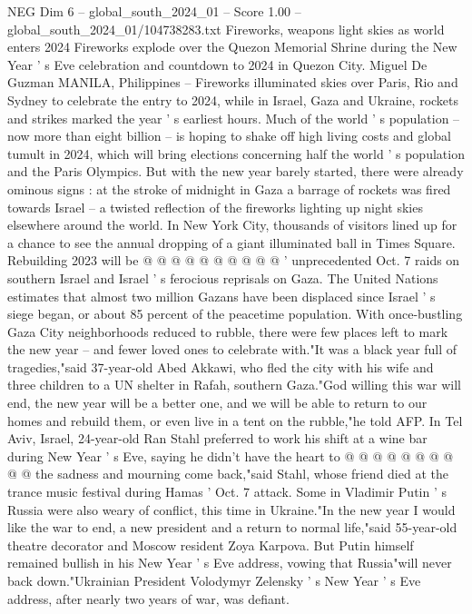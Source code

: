 \begin{textsample}{NEG Dim 6 – global\_south\_2024\_01 – Score 1.00 – global\_south\_2024\_01/104738283.txt}  \label{ex:f6_neg_372}
Fireworks, weapons light skies as world enters 2024 Fireworks explode over the Quezon Memorial Shrine during the New Year ' s Eve celebration and countdown to 2024 in Quezon City.
Miguel De Guzman MANILA, Philippines -- Fireworks illuminated skies over Paris, Rio and Sydney to celebrate the entry to 2024, while in Israel, Gaza and Ukraine, rockets and strikes marked the year ' s earliest hours.
Much of the world ' s population -- now more than eight billion -- is hoping to shake off high living costs and global tumult in 2024, which will bring elections concerning half the world ' s population and the Paris Olympics.
But with the new year barely started, there were already ominous signs : at the stroke of midnight in Gaza a barrage of rockets was fired towards Israel -- a twisted reflection of the fireworks lighting up night skies elsewhere around the world.
In New York City, thousands of visitors lined up for a chance to see the annual dropping of a giant illuminated ball in Times Square.
Rebuilding 2023 will be @ @ @ @ @ @ @ @ @ @ ' unprecedented Oct. 7 raids on southern Israel and Israel ' s ferocious reprisals on Gaza.
The United Nations estimates that almost two million Gazans have been displaced since Israel ' s siege began, or about 85 percent of the peacetime population.
With once-bustling Gaza City neighborhoods reduced to rubble, there were few places left to mark the new year -- and fewer loved ones to celebrate with."It was a black year full of tragedies,"said 37-year-old Abed Akkawi, who fled the city with his wife and three children to a UN shelter in Rafah, southern Gaza."God willing this war will end, the new year will be a better one, and we will be able to return to our homes and rebuild them, or even live in a tent on the rubble,"he told AFP.
In Tel Aviv, Israel, 24-year-old Ran Stahl preferred to work his shift at a wine bar during New Year ' s Eve, saying he didn't have the heart to @ @ @ @ @ @ @ @ @ @ the sadness and mourning come back,"said Stahl, whose friend died at the trance music festival during Hamas ' Oct. 7 attack.
Some in Vladimir Putin ' s Russia were also weary of conflict, this time in Ukraine."In the new year I would like the war to end, a new president and a return to normal life,"said 55-year-old theatre decorator and Moscow resident Zoya Karpova.
But Putin himself remained bullish in his New Year ' s Eve address, vowing that Russia"will never back down."Ukrainian President Volodymyr Zelensky ' s New Year ' s Eve address, after nearly two years of war, was defiant.

\end{textsample}
